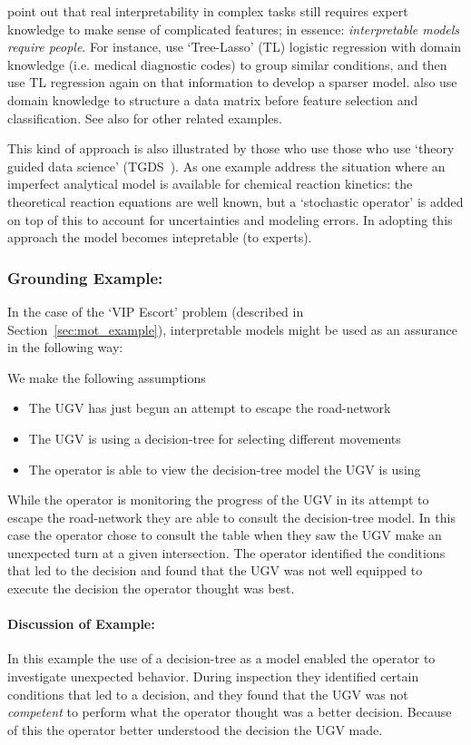 \citet{Park2016-ld} point out that real interpretability in complex tasks still requires expert knowledge to make sense of complicated features; in essence: \emph{interpretable models require people}. For instance, \citet{Jovanovic2016-gw} use `Tree-Lasso' (TL) logistic regression with domain knowledge (i.e. medical diagnostic codes) to group similar conditions, and then use TL regression again on that information to develop a sparser model. \citet{Zycinski2012-jj} also use domain knowledge to structure a data matrix before feature selection and classification. See also \citet{Zhang2018-no,Khoa2018-gh} for other related examples.

This kind of approach is also illustrated by those who use those who use `theory guided data science' (TGDS~\cite{Kumar2016-yw,Faghmous2014-og}). As one example \citet{Morrison2016-fz} address the situation where an imperfect analytical model is available for chemical reaction kinetics: the theoretical reaction equations are well known, but a `stochastic operator' is added on top of this to account for uncertainties and modeling errors. In adopting this approach the model becomes intepretable (to experts).

\subsubsection{Grounding Example:}
In the case of the `VIP Escort' problem (described in Section~\ref{sec:mot_example}), interpretable models might be used as an assurance in the following way:

We make the following assumptions

\begin{itemize}
    \item The UGV has just begun an attempt to escape the road-network
    \item The UGV is using a decision-tree for selecting different movements
    \item The operator is able to view the decision-tree model the UGV is using
\end{itemize}

While the operator is monitoring the progress of the UGV in its attempt to escape the road-network they are able to consult the decision-tree model. In this case the operator chose to consult the table when they saw the UGV make an unexpected turn at a given intersection. The operator identified the conditions that led to the decision and found that the UGV was not well equipped to execute the decision the operator thought was best.
\paragraph{\textbf{Discussion of Example:}} In this example the use of a decision-tree as a model enabled the operator to investigate unexpected behavior. During inspection they identified certain conditions that led to a decision, and they found that the UGV was not \emph{competent} to perform what the operator thought was a better decision. Because of this the operator better understood the decision the UGV made.
